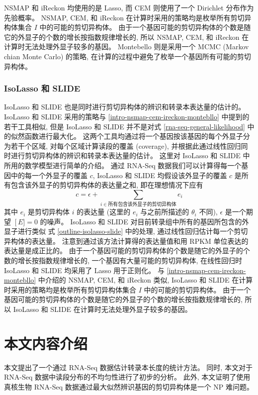 NSMAP 和 iReckon 均使用的是 Lasso, 
而 CEM 则使用了一个 Dirichlet 分布作为先验概率。
NSMAP, CEM, 和 iReckon 在计算时采用的策略均是枚举所有剪切异构体集合 $I$ 中的可能的剪切异构体。 
由于一个基因可能的剪切异构体的个数是随它的外显子的个数的增长按指数规律增长的, 
所以 NSMAP, CEM, 和 iReckon 在计算时无法处理外显子较多的基因。 
Montebello 则是采用一个 MCMC (Markov chian Monte Carlo) \cite{robert2004monte} 的策略, 
在计算的过程中避免了枚举一个基因所有可能的剪切异构体。 

\subsubsection{IsoLasso 和 SLIDE}
IsoLasso 和 SLIDE 也是同时进行剪切异构体的辨识和转录本表达量的估计的。 
IsoLasso 和 SLIDE 采用的策略与 \ref{intro-nsmap-cem-ireckon-montebllo} 
中提到的若干工具相似, 但是 IsoLasso 和 SLIDE 并不是对式 
\eqref{rna-seq-general-likelihood} 中的似然函数进行最大化。 
这两个工具均通过将一个基因按该基因的每个外显子分为若干个区域, 
对每个区域计算读段的覆盖 (coverage), 
并根据此通过线性回归同时进行剪切异构体的辨识和转录本表达量的估计。 
这里对 IsoLasso 和 SLIDE 中所用的数学模型进行简单的介绍。 
通过 RNA-Seq 数据我们可以计算得每一个基因中的每一个外显子的覆盖 $c$, 
IsoLasso 和 SLIDE 均假设该外显子的覆盖 $c$ 是所有包含该外显子的剪切异构体的表达量之和, 
即在理想情况下应有
\begin{equation}
\label{outline-isolasso-slide}
c = \epsilon + \sum_{i \in \text{所有包含该外显子的剪切异构体}} e_i
\end{equation}
其中 $e_i$ 是剪切异构体 $i$ 的表达量 (这里的 $e_i$ 与之前所描述的 $\theta_i$ 不同), 
$\epsilon$ 是一个期望 $\operatorname[E] = 0$ 的噪声。 
IsoLasso 和 SLIDE 对目前转录组中所有的基因所包含的外显子进行类似 
式 \eqref{outline-isolasso-slide} 中的处理, 通过线性回归估计每一个剪切异构体的表达量。 
注意到通过该方法计算得的表达量值和用 RPKM 单位表达的表达量是成正比的。 
由于一个基因可能的剪切异构体的个数是随它的外显子的个数的增长按指数规律增长的, 
一个基因有大量可能的剪切异构体, 
在线性回归时 IsoLasso 和 SLIDE 均采用了 Lasso \cite{tibshirani1996regression} 用于正则化。 
与 \ref{intro-nsmap-cem-ireckon-montebllo} 中介绍的 NSMAP, CEM, 和 iReckon 类似, 
IsoLasso 和 SLIDE 在计算时采用的策略均是枚举所有剪切异构体集合 $I$ 中的可能的剪切异构体。 
由于一个基因可能的剪切异构体的个数是随它的外显子的个数的增长按指数规律增长的, 
所以 IsoLasso 和 SLIDE 在计算时无法处理外显子较多的基因。 

\section{本文内容介绍}
本文提出了一个通过 RNA-Seq 数据估计转录本长度的统计方法。 
同时, 本文对于 RNA-Seq 数据中读段分布的不均匀性进行了初步的分析。 
此外, 本文证明了使用真核生物 RNA-Seq 数据通过最大似然辨识基因的剪切异构体是一个 NP 难问题。

